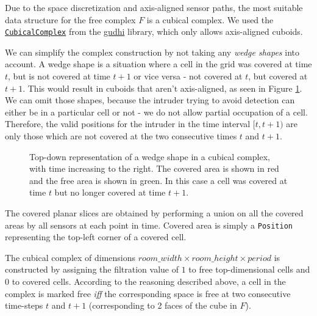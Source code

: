 \documentclass{article}
\begin{document}
Due to the space discretization and axis-aligned sensor paths, the most suitable data structure for the free complex $F$ is a cubical complex.
We used the \href{https://gudhi.inria.fr/python/latest/cubical_complex_user.html}{\texttt{CubicalComplex}} from the \href{https://pypi.org/project/gudhi/}{gudhi} library, which only allows axis-aligned cuboids.

We can simplify the complex construction by not taking any {\it wedge shapes} into account.
A wedge shape is a situation where a cell in the grid was covered at time $t$, but is not covered at time $t + 1$ or vice versa - not covered at $t$, but covered at $t + 1$.
This would result in cuboids that aren't axis-aligned, as seen in Figure \ref{fig:wedge}.
We can omit those shapes, because the intruder trying to avoid detection can either be in a particular cell or not - we do not allow partial occupation of a cell.
Therefore, the valid positions for the intruder in the time interval $[t, t + 1)$
are only those which are not covered at the two consecutive times $t$ and $t + 1$.

\smallskip

\begin{figure}[H]
  \centering


  \caption{Top-down representation of a wedge shape in a cubical complex, with time increasing to the right. The covered area is shown in red and the free area is shown in green. In this case a cell was covered at time $t$ but no longer covered at time $t + 1$.}
  \label{fig:wedge}
\end{figure}

The covered planar slices are obtained by performing a union on all the covered areas by all sensors at each point in time.
Covered area is simply a \texttt{Position} representing the top-left corner of a covered cell.

The cubical complex of dimensions $ room\_width \times room\_height \times period $ is constructed by assigning the filtration value of $1$ to free top-dimensional cells and $0$ to covered cells.
According to the reasoning described above, a cell in the complex is marked free {\it iff} the corresponding space is free at two consecutive time-steps $t$ and $t + 1$ (corresponding to 2 faces of the cube in $F$).
\end{document}
